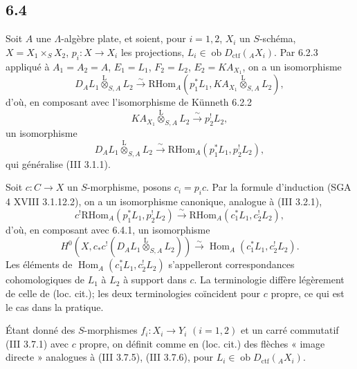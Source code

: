 \documentclass[11pt]{article}
\DeclareMathOperator{\Hom}{Hom}
\providecommand{\RHom}{\mathrm{RHom}}
\providecommand{\lten}{\overset{\mathrm L}{\otimes}}
\providecommand{\Ob}{\operatorname{ob}}
\providecommand{\RHom}{\mathrm{RHom}}
\providecommand{\Hom}{\operatorname{Hom}}
\providecommand{\lten}{\overset{\mathrm L}{\otimes}}
\providecommand{\RHom}{\mathrm R\mathcal{H}om}
\providecommand{\lten}{\overset{\mathrm L}{\otimes}}
\providecommand{\Ob}{\operatorname{ob}}
\providecommand{\lten}{\overset{\mathrm L}{\otimes}}
\providecommand{\lten}{\overset{\mathrm L}{\otimes}}
\providecommand{\Ob}{\operatorname{Ob}}
\providecommand{\lten}{\overset{\mathrm L}{\otimes}}
\providecommand{\RHom}{\mathrm{RHom}}
\providecommand{\Hom}{\operatorname{Hom}}
\providecommand{\Ob}{\operatorname{ob}}
\providecommand{\Ob}{\operatorname{Ob}}
\providecommand{\lten}{\overset{\mathrm L}{\otimes}}
\begin{document}
\subsection*{6.4}
Soit $A$ une $\Lambda$-algèbre plate, et soient, pour $i=1,2$, $X_i$ un $S$-schéma, $X=X_1\times_SX_2$, $p_i:X\to X_i$ les projections, $L_i\in\Ob D_{\mathrm{ctf}}({}_AX_i)$. Par 6.2.3 appliqué à $A_1=A_2=A$, $E_1=L_1$, $F_2=L_2$, $E_2=KA_{X_1}$, on a un isomorphisme
\[
D_A L_1\lten_{S,A}L_2
\xrightarrow{\sim}
\RHom_A(p_1^*L_1,KA_{X_1}\lten_{S,A}L_2),
\]
d'où, en composant avec l'isomorphisme de Künneth 6.2.2
\[
KA_{X_1}\lten_{S,A}L_2\xrightarrow{\sim}p_2^!L_2,
\]
un isomorphisme
\begin{equation}
D_AL_1\lten_{S,A}L_2
\xrightarrow{\sim}
\RHom_A(p_1^*L_1,p_2^!L_2),
\tag{6.4.1}
\end{equation}
qui généralise (III 3.1.1).

Soit $c:C\to X$ un $S$-morphisme, posons $c_i=p_ic$. Par la formule d'induction (SGA 4 XVIII 3.1.12.2), on a un isomorphisme canonique, analogue à (III 3.2.1),
\begin{equation}
c^!\RHom_A(p_1^*L_1,p_2^!L_2)
\xrightarrow{\sim}
\RHom_A(c_1^*L_1,c_2^!L_2),
\tag{6.4.2}
\end{equation}
d'où, en composant avec 6.4.1, un isomorphisme
\begin{equation}
H^0(X,c_*c^!(D_AL_1\lten_{S,A}L_2))
\xrightarrow{\sim}
\Hom_A(c_1^*L_1,c_2^!L_2).
\tag{6.4.3}
\end{equation}
Les éléments de $\Hom_A(c_1^*L_1,c_2^!L_2)$ s'appelleront correspondances cohomologiques de $L_1$ à $L_2$ à support dans $c$. La terminologie diffère légèrement de celle de (loc. cit.); les deux terminologies coïncident pour $c$ propre, ce qui est le cas dans la pratique.

Étant donné des $S$-morphismes $f_i:X_i\to Y_i$ $(i=1,2)$ et un carré commutatif (III 3.7.1) avec $c$ propre, on définit comme en (loc. cit.) des flèches « image directe » analogues à (III 3.7.5), (III 3.7.6), pour $L_i\in\Ob D_{\mathrm{ctf}}({}_AX_i)$.
\end{document}
